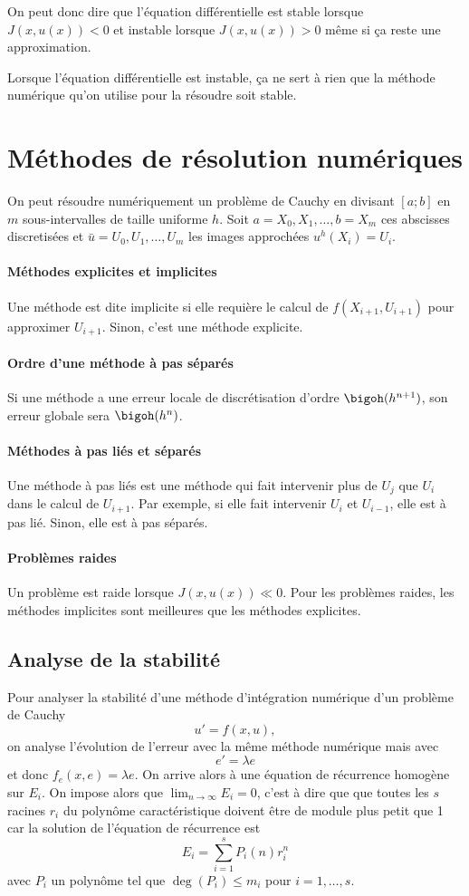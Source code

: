 On peut donc dire que l'équation différentielle est stable lorsque
$J(x, u(x)) < 0$ et instable lorsque $J(x, u(x)) > 0$
même si ça reste une approximation.

Lorsque l'équation différentielle est instable, ça ne sert à rien
que la méthode numérique qu'on utilise pour la résoudre soit stable.

\section{Méthodes de résolution numériques}
On peut résoudre numériquement un problème de Cauchy en divisant
$[a;b]$ en $m$ sous-intervalles de taille uniforme $h$.
Soit $a = X_0, X_1, \ldots, b = X_m$ ces abscisses discretisées et
$\bar{u} = U_0, U_1, \ldots, U_m$ les images approchées $u^h(X_i) = U_i$.

\paragraph{Méthodes explicites et implicites}
Une méthode est dite implicite si elle requière le calcul de
$f(X_{i+1},U_{i+1})$ pour approximer $U_{i+1}$.
Sinon, c'est une méthode explicite.

\paragraph{Ordre d'une méthode à pas séparés}
Si une méthode a une erreur locale de discrétisation d'ordre
$\bigoh(h^{n+1})$, son erreur globale sera $\bigoh(h^n)$.

\paragraph{Méthodes à pas liés et séparés}
Une méthode à pas liés est une méthode qui fait intervenir
plus de $U_j$ que $U_i$ dans le calcul de $U_{i+1}$.
Par exemple, si elle fait intervenir $U_i$ et $U_{i-1}$, elle
est à pas lié.
Sinon, elle est à pas séparés.

\paragraph{Problèmes raides}
Un problème est raide lorsque $J(x, u(x)) \ll 0$.
Pour les problèmes raides, les méthodes implicites sont meilleures que les
méthodes explicites.

\subsection{Analyse de la stabilité}
Pour analyser la stabilité d'une méthode d'intégration numérique d'un
problème de Cauchy
\[ u' = f(x, u), \]
on analyse l'évolution de l'erreur avec la même méthode
numérique mais avec
\[ e' = \lambda e \]
et donc $f_e(x, e) = \lambda e$.
On arrive alors à une équation de récurrence homogène sur $E_i$.
On impose alors que $\lim_{n \to \infty} E_i = 0$, c'est à dire que
que toutes les $s$ racines $r_i$ du polynôme caractéristique doivent être de module plus petit que 1
car la solution de l'équation de récurrence est
\[ E_i = \sum_{i = 1}^s P_i(n)r_i^n \]
avec $P_i$ un polynôme tel que
$\deg(P_i) \leq m_i$ pour $i = 1, \ldots, s$.

